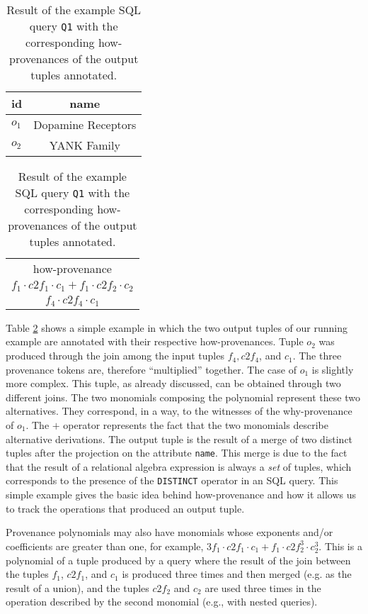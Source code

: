 \begin{table}[]
\centering
  \begin{tabular}{|l|c|}
  \hline
    id & name\\
    \hline
    $o_1$ &  Dopamine Receptors\\
    $o_2$ & YANK Family\\
    \hline
  \end{tabular}
  \begin{tabular}{c}
  	how-provenance   \\
  	$f_1 \cdot c2f_1 \cdot c_1 + f_1 \cdot c2f_2 \cdot c_2$ \\
  	$f_4 \cdot c2f_4 \cdot c_1$ \\
  \end{tabular}
    \caption{Result of the example SQL query \texttt{Q1} with the corresponding how-provenances of the output tuples annotated.}
  \label{table:result_how_prov}
\end{table} 

Table \ref{table:result_how_prov} shows a simple example in which the two output tuples of our running example are annotated with their respective how-provenances. 
Tuple $o_2$ was produced through the join among the input tuples $f_4, c2f_4$, and $c_1$. The three provenance tokens are, therefore  ``multiplied'' together. 
The case of $o_1$ is slightly more complex. This tuple, as already discussed, can be obtained through two different joins. The two monomials composing the polynomial represent these two alternatives. They correspond, in a way, to the witnesses of the why-provenance of $o_1$.
The $+$ operator represents the fact that the two monomials describe alternative derivations. The output tuple is the result of a merge of two distinct tuples after the projection on the attribute \texttt{name}. This merge is due to the fact that the result of a relational algebra expression is always a {\em set} of tuples, which corresponds to the presence of the \texttt{DISTINCT} operator in an SQL query. 
This simple example gives the basic idea behind how-provenance and how it allows us to track the operations that produced an output tuple. 

Provenance polynomials may also have monomials whose exponents and/or coefficients are greater than one, for example, $3f_1 \cdot c2f_1 \cdot c_1 + f_1 \cdot c2f_2^3 \cdot c_2^3$. This is a polynomial of a tuple produced by a query where the result of the join between the tuples $f_1$, $c2f_1$, and $c_1$ is produced three times and then merged (e.g. as the result of a union), and the tuples $c2f_2$ and $c_2$ are used three times in the operation described by the second monomial (e.g., with nested queries). 

